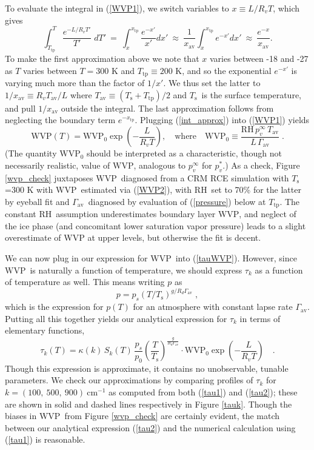 \documentclass[10pt]{article}
\newcommand{\beqn}{\begin{equation}}
\newcommand{\eeqn}{\end{equation}}
\newcommand{\eqnref}[1]{(\ref{#1})}
\newcommand{\cminverse}{\ensuremath{\mathrm{cm^{-1}}}}
\newcommand{\Tav}{\ensuremath{T_\mathrm{av}}}
\newcommand{\Ts}{\ensuremath{T_\mathrm{s}}}
\newcommand{\ps}{\ensuremath{p_s}}
\newcommand{\RH}{\ensuremath{\mathrm{RH}}}
\newcommand{\WVP}{\ensuremath{\mathrm{WVP}}}
\newcommand{\Ttp}{\ensuremath{T_\mathrm{tp}}}
\newcommand{\gammaav}{\ensuremath{\Gamma_\mathrm{av}}}
\begin{document}
To evaluate the integral in \eqnref{WVP1}, we switch variables to $x\equiv L/R_v T$, which gives
	\beqn
		\int^T_{\Ttp} \frac{e^{-L/R_v T'}}{T'}\; dT' \ = \ \int_x^{x_\mathrm{tp}} \frac{e^{-x'}}{x'} dx' \ \approx\ \frac{1}{x_{\mathrm{av}}}\int_x^{x_\mathrm{tp}} e^{-x'} dx' \ \approx\ \frac{e^{-x}}{x_{\mathrm{av}}}.
		\label{int_approx}
	\eeqn
To make the first approximation above we note that $x$ varies between -18 and -27 as $T$ varies between $T=300$ K and $\Ttp \equiv  200$ K, and so the exponential $e^{-x'}$ is varying much more than the factor of $1/x'$. We thus set the latter  to $1/x_{\mathrm{av}}\equiv R_v \Tav/L$ where $\Tav \equiv (\Ts + \Ttp)/2$ and \Ts\ is the surface temperature, and pull $1/x_{\mathrm{av}}$ outside the integral. The last approximation follows from neglecting the boundary term $e^{-x_\mathrm{tp}}$. Plugging \eqnref{int_approx} into \eqnref{WVP1} yields
	\beqn
		\WVP(T) =\WVP_0\exp\left(-\frac{L}{R_vT}\right),\quad \mbox{where}\quad  \WVP_0 \equiv \frac{\RH\, p_v^\infty\, \Tav}{L\,\gammaav} \; .
	\label{WVP2}
	\eeqn
(The quantity $\WVP_0$ should be interpreted as a characteristic, though not necessarily realistic, value of \WVP, analogous to $p_v^\infty$ for $p_v^*$.)  As a  check, Figure \ref{wvp_check} juxtaposes \WVP\ diagnosed from a CRM RCE simulation with \Ts=300 K with \WVP\ estimated via \eqnref{WVP2}, with \RH\ set to 70\% for the latter by eyeball fit and \gammaav\ diagnosed by evaluation of \eqnref{pressure} below at $\Ttp$. The constant \RH\ assumption underestimates boundary layer \WVP, and neglect of the ice phase (and concomitant lower saturation vapor pressure) leads to a slight overestimate of WVP at upper levels, but otherwise the fit is decent.

We can now plug in our  expression for \WVP\ into \eqnref{tauWVP}. However, since \WVP\ is naturally a function of temperature, we should express $\tau_k$ as a function of temperature as well. This means writing $p$ as 
	\beqn
		p=\ps(T/\Ts)^{g/R_d\gammaav} \; ,
	\label{pressure}
	\eeqn 
	which is the expression for $p(T)$ for an atmosphere with constant lapse rate $\gammaav$. Putting all this together yields our  analytical expression for $\tau_k$ in terms of elementary functions,
	\beqn
		\tau_k(T) = \kappa(k)\, S_k(T)\, \frac{\ps}{p_0}\left(\frac{T}{\Ts}\right)^{\frac{g}{R_d\gammaav}}\cdot \WVP_0\exp\left(-\frac{L}{R_v T}\right) \quad .
	\label{tau2}
	\eeqn
Though this expression is approximate, it contains no unobservable, tunable parameters. We check our approximations by comparing profiles of $\tau_k$ for  $k=(100,\ 500,\ 900)\ \cminverse$ as computed from both \eqnref{tau1} and \eqnref{tau2}; these are shown in solid and dashed lines respectively in Figure \ref{tauk}. Though the biases in \WVP\ from Figure \ref{wvp_check} are certainly evident, the match between our analytical expression \eqnref{tau2} and the numerical calculation using \eqnref{tau1} is reasonable.
\end{document}
